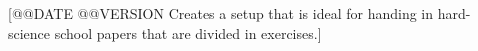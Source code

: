 [@@DATE @@VERSION Creates a setup that is ideal for handing in hard-science school papers that are divided in exercises.]
